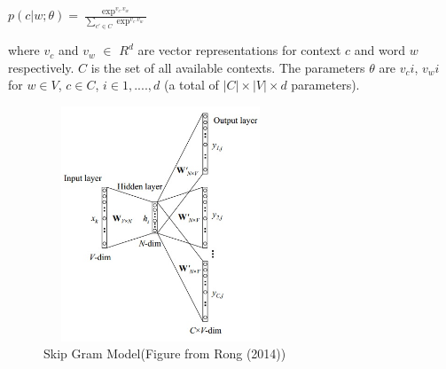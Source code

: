 \def\DevnagVersion{2.15}\documentclass[11pt]{article}
\begin{document}
\begin{center} $p(c|w;\theta)=\frac{\exp^{v_c.v_w}}{\sum_{c' \in C}\exp^{v_c.v_w}}$ \end{center}
where $v_c$ and $v_w$ $\in$ $R^d$ are vector representations for context $c$ and word $w$ respectively. $C$ is the set of all available contexts. The parameters $\theta$ are $v_ci$, $v_wi$ for $w \in V$, $c \in C$, $i \in 1,....,d$ (a total of $|C| \times |V| \times d$ parameters).\\

\begin{figure}[ht!]
\centering
\includegraphics[width=70mm, height=70mm]{skipgram.jpg}
\caption{Skip Gram Model(Figure from Rong (2014)) \label{fig:skipgram}}
\end{figure}

\end{document}
